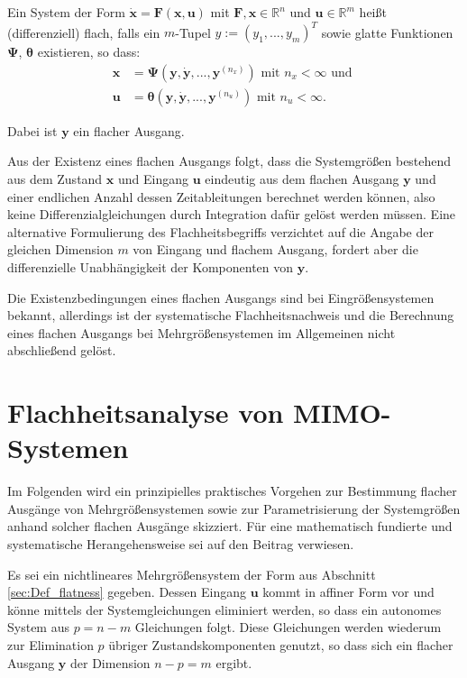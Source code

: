 Ein System der Form $\dot{\mathbf{x}} = \mathbf{F}(\mathbf{x}, \mathbf{u})$ mit $\mathbf{F}, \mathbf{x} \in \mathbb{R}^n$ und $\mathbf{u} \in \mathbb{R}^m$ heißt (differenziell) flach, falls ein $m$-Tupel $y := (y_1, ..., y_m)^T$ sowie glatte Funktionen $\mathbf{\Psi}$, $\boldsymbol{\theta}$ existieren, so dass:
\begin{align}
\mathbf{x} &= \mathbf{\Psi}(\mathbf{y}, \dot{\mathbf{y}}, ..., \mathbf{y}^{(n_x)}) \text{ mit } n_x < \infty \text{ und } \\
\mathbf{u} &= \boldsymbol{\theta}(\mathbf{y}, \dot{\mathbf{y}}, ..., \mathbf{y}^{(n_u)}) \text{ mit } n_u < \infty.
\end{align}

Dabei ist $\mathbf{y}$ ein flacher Ausgang. 

Aus der Existenz eines flachen Ausgangs folgt, dass die Systemgrößen bestehend aus dem Zustand $\mathbf{x}$ und Eingang $\mathbf{u}$ eindeutig aus dem flachen Ausgang $\mathbf{y}$ und einer endlichen Anzahl dessen Zeitableitungen berechnet werden können, also keine Differenzialgleichungen durch Integration dafür gelöst werden müssen. Eine alternative Formulierung des Flachheitsbegriffs verzichtet auf die Angabe der gleichen Dimension $m$ von Eingang und flachem Ausgang, fordert aber die differenzielle Unabhängigkeit der Komponenten von $\mathbf{y}$.

Die Existenzbedingungen eines ﬂachen Ausgangs sind bei Eingrößensystemen bekannt, allerdings ist der systematische Flachheitsnachweis und die Berechnung eines
ﬂachen Ausgangs bei Mehrgrößensystemen im Allgemeinen nicht abschließend gelöst. \cite[S. 185]{NLRT_Roebenack}

\section{Flachheitsanalyse von MIMO-Systemen}

Im Folgenden wird ein prinzipielles praktisches Vorgehen zur Bestimmung flacher Ausgänge von Mehrgrößensystemen sowie zur Parametrisierung der Systemgrößen anhand solcher flachen Ausgänge skizziert. Für eine mathematisch fundierte und systematische Herangehensweise sei auf den Beitrag \cite{Fritzsche2016} verwiesen.

Es sei ein nichtlineares Mehrgrößensystem der Form aus Abschnitt \ref{sec:Def_flatness} gegeben. Dessen Eingang $\mathbf{u}$ kommt in affiner Form vor und könne mittels der Systemgleichungen eliminiert werden, so dass ein autonomes System aus $p = n - m$ Gleichungen folgt. Diese Gleichungen werden wiederum zur Elimination $p$ übriger Zustandskomponenten genutzt, so dass sich ein flacher Ausgang $\mathbf{y}$ der Dimension $n - p = m$ ergibt. 


